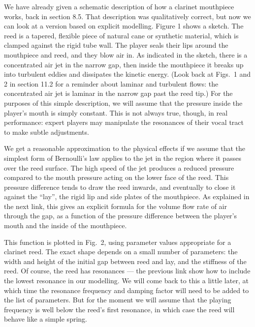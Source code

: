   We have already given a schematic description of how a clarinet mouthpiece 
  works, back in section 8.5. That description was qualitatively correct, but 
  now we can look at a version based on explicit modelling. Figure 1 shows a 
  sketch. The reed is a tapered, flexible piece of natural cane or synthetic 
  material, which is clamped against the rigid tube wall. The player seals 
  their lips around the mouthpiece and reed, and they blow air in. As indicated 
  in the sketch, there is a concentrated air jet in the narrow gap, then inside 
  the mouthpiece it breaks up into turbulent eddies and dissipates the kinetic 
  energy. (Look back at Figs.\ 1 and 2 in section 11.2 for a reminder about 
  laminar and turbulent flows: the concentrated air jet is laminar in the 
  narrow gap past the reed tip.) For the purposes of this simple description, 
  we will assume that the pressure inside the player's mouth is simply 
  constant. This is not always true, though, in real performance: expert 
  players may manipulate the resonances of their vocal tract to make subtle 
  adjustments. 


  We get a reasonable approximation to the physical effects if we assume that 
  the simplest form of Bernoulli’s law applies to the jet in the region where 
  it passes over the reed surface. The high speed of the jet produces a reduced 
  pressure compared to the mouth pressure acting on the lower face of the reed. 
  This pressure difference tends to draw the reed inwards, and eventually to 
  close it against the “lay”, the rigid lip and side plates of the mouthpiece. 
  As explained in the next link, this gives an explicit formula for the volume 
  flow rate of air through the gap, as a function of the pressure difference 
  between the player’s mouth and the inside of the mouthpiece. 

  This function is plotted in Fig.\ 2, using parameter values appropriate for a 
  clarinet reed. The exact shape depends on a small number of parameters: the 
  width and height of the initial gap between reed and lay, and the stiffness 
  of the reed. Of course, the reed has resonances — the previous link show how 
  to include the lowest resonance in our modelling. We will come back to this a 
  little later, at which time the resonance frequency and damping factor will 
  need to be added to the list of parameters. But for the moment we will assume 
  that the playing frequency is well below the reed’s first resonance, in which 
  case the reed will behave like a simple spring. 

